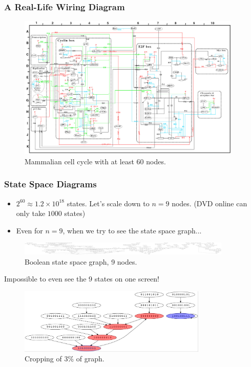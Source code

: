 \documentclass{beamer}
\begin{document}
\begin{frame}
 \frametitle{A Real-Life Wiring Diagram}
\begin{figure}
    \vspace{-10pt}
    \caption{Mammalian cell cycle with at least 60 nodes.}
    \centering
    \includegraphics[width = 0.95\textwidth]{hugewiringdiagram.jpg}
    \vspace{-10pt}
\end{figure}
\end{frame}

\begin{frame}
 \frametitle{State Space Diagrams}
\begin{itemize}
 \item $2^{60} \approx 1.2 \times 10^{18}$ states. Let's scale down to $n = 9$ nodes. (DVD online can only take $1000$ states)
 \item Even for $n = 9$, when we try to see the state space graph...
\end{itemize}
\begin{figure}
    \caption{Boolean state space graph, 9 nodes.}
    \centering
    \includegraphics[width = 4in]{9states-1.jpg}
\end{figure}
Impossible to even see the 9 states on one screen!
\begin{figure}
  \centering
  \includegraphics[width=0.8\textwidth]{RandomNetwork.jpg}
  \caption{Cropping of 3\% of graph.}
\end{figure}
\end{frame}
\end{document}
